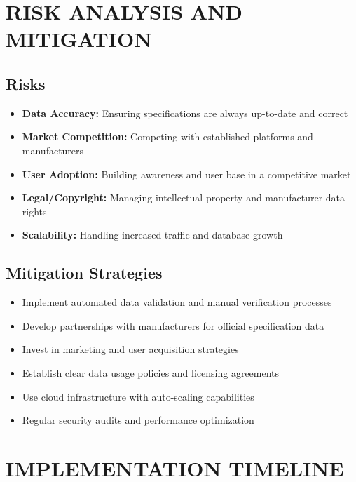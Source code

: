 \documentclass[12pt]{article}
\begin{document}
\section{RISK ANALYSIS AND MITIGATION}

\subsection{Risks}
\begin{itemize}
    \item \textbf{Data Accuracy:} Ensuring specifications are always up-to-date and correct
    \item \textbf{Market Competition:} Competing with established platforms and manufacturers
    \item \textbf{User Adoption:} Building awareness and user base in a competitive market
    \item \textbf{Legal/Copyright:} Managing intellectual property and manufacturer data rights
    \item \textbf{Scalability:} Handling increased traffic and database growth
\end{itemize}

\subsection{Mitigation Strategies}
\begin{itemize}
    \item Implement automated data validation and manual verification processes
    \item Develop partnerships with manufacturers for official specification data
    \item Invest in marketing and user acquisition strategies
    \item Establish clear data usage policies and licensing agreements
    \item Use cloud infrastructure with auto-scaling capabilities
    \item Regular security audits and performance optimization
\end{itemize}

\section{IMPLEMENTATION TIMELINE}
\end{document}
